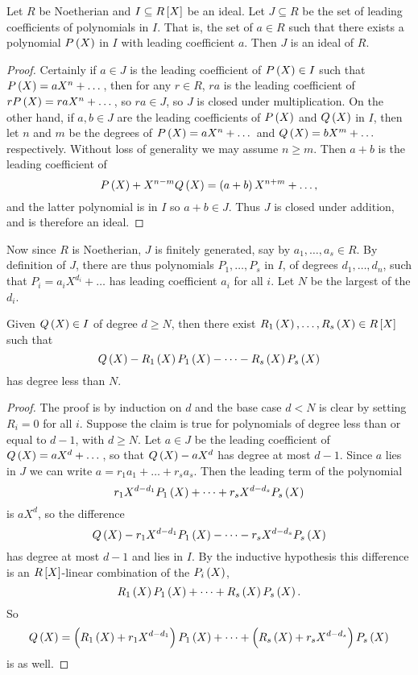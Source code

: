 \begin{lemma}
Let $ R $ be Noetherian and $ I \subseteq R\sbr{X} $ be an ideal. Let $ J \subseteq R $ be the set of leading coefficients of polynomials in $ I $. That is, the set of $ a \in R $ such that there exists a polynomial $ P\br{X} $ in $ I $ with leading coefficient $ a $. Then $ J $ is an ideal of $ R $.
\end{lemma}

\begin{proof}
Certainly if $ a \in J $ is the leading coefficient of $ P\br{X} \in I $ such that $ P\br{X} = aX^n + \dots $, then for any $ r \in R $, $ ra $ is the leading coefficient of $ rP\br{X} = raX^n + \dots $, so $ ra \in J $, so $ J $ is closed under multiplication. On the other hand, if $ a, b \in J $ are the leading coefficients of $ P\br{X} $ and $ Q\br{X} $ in $ I $, then let $ n $ and $ m $ be the degrees of $ P\br{X} = aX^n + \dots $ and $ Q\br{X} = bX^m + \dots $ respectively. Without loss of generality we may assume $ n \ge m $. Then $ a + b $ is the leading coefficient of
$$ P\br{X} + X^{n - m}Q\br{X} = \br{a + b}X^{n + m} + \dots, $$
and the latter polynomial is in $ I $ so $ a + b \in J $. Thus $ J $ is closed under addition, and is therefore an ideal.
\end{proof}

Now since $ R $ is Noetherian, $ J $ is finitely generated, say by $ a_1, \dots, a_s \in R $. By definition of $ J $, there are thus polynomials $ P_1, \dots, P_s $ in $ I $, of degrees $ d_1, \dots, d_n $, such that $ P_i = a_iX^{d_i} + \dots $ has leading coefficient $ a_i $ for all $ i $. Let $ N $ be the largest of the $ d_i $.

\begin{lemma}
Given $ Q\br{X} \in I $ of degree $ d \ge N $, then there exist $ R_1\br{X}, \dots, R_s\br{X} \in R\sbr{X} $ such that
$$ Q\br{X} - R_1\br{X}P_1\br{X} - \dots - R_s\br{X}P_s\br{X} $$
has degree less than $ N $.
\end{lemma}

\begin{proof}
The proof is by induction on $ d $ and the base case $ d < N $ is clear by setting $ R_i = 0 $ for all $ i $. Suppose the claim is true for polynomials of degree less than or equal to $ d - 1 $, with $ d \ge N $. Let $ a \in J $ be the leading coefficient of $ Q\br{X} = aX^d + \dots $, so that $ Q\br{X} - aX^d $ has degree at most $ d - 1 $. Since $ a $ lies in $ J $ we can write $ a = r_1a_1 + \dots + r_sa_s $. Then the leading term of the polynomial
$$ r_1X^{d - d_1}P_1\br{X} + \dots + r_sX^{d - d_s}P_s\br{X} $$
is $ aX^d $, so the difference
$$ Q\br{X} - r_1X^{d - d_1}P_1\br{X} - \dots - r_sX^{d - d_s}P_s\br{X} $$
has degree at most $ d - 1 $ and lies in $ I $. By the inductive hypothesis this difference is an $ R\sbr{X} $-linear combination of the $ P_i\br{X} $,
$$ R_1\br{X}P_1\br{X} + \dots + R_s\br{X}P_s\br{X}. $$
So
$$ Q\br{X} = \br{R_1\br{X} + r_1X^{d - d_1}}P_1\br{X} + \dots + \br{R_s\br{X} + r_sX^{d - d_s}}P_s\br{X} $$
is as well.
\end{proof}

